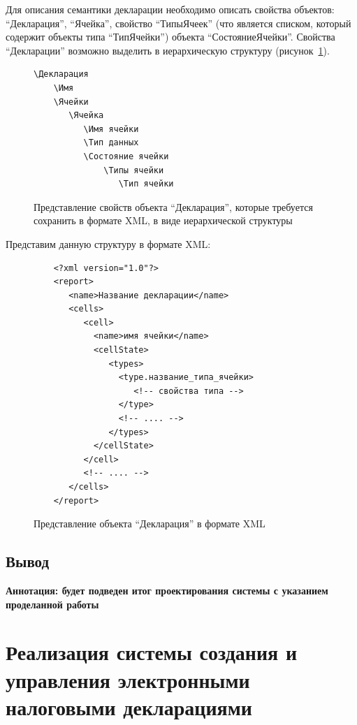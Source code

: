 \documentclass[14pt,a4paper]{reportmod}
\begin{document}
Для описания семантики декларации необходимо описать свойства объектов: ``Декларация'', ``Ячейка'', свойство ``ТипыЯчеек'' (что является списком, который содержит объекты типа ``ТипЯчейки'') объекта ``СостояниеЯчейки''. Свойства ``Декларации'' возможно выделить в иерархическую структуру (рисунок~\ref{pic:report_hierarchy}).
\begin{figure}
\begin{verbatim}
\Декларация
    \Имя
    \Ячейки
       \Ячейка
          \Имя ячейки
          \Тип данных
          \Состояние ячейки
              \Типы ячейки
                 \Тип ячейки
\end{verbatim}
\caption{Представление свойств объекта ``Декларация'', которые требуется сохранить в формате XML, в виде иерархической структуры}
\label{pic:report_hierarchy}
\end{figure}
Представим данную структуру в формате XML:
\begin{figure}
  \begin{verbatim}
    <?xml version="1.0"?>
    <report>
       <name>Название декларации</name>
       <cells>
          <cell>
            <name>имя ячейки</name>
            <cellState>
               <types>
                 <type.название_типа_ячейки>
                    <!-- свойства типа -->
                 </type>
                 <!-- .... -->
               </types>
            </cellState>
          </cell>
          <!-- .... -->
       </cells>
    </report>
  \end{verbatim}
  \caption{Представление объекта ``Декларация'' в формате XML}
\end{figure}

\section{Вывод}

\textbf{Аннотация: будет подведен итог проектирования системы с указанием проделанной работы}

\chapter{Реализация системы создания и управления электронными налоговыми декларациями}
\end{document}

